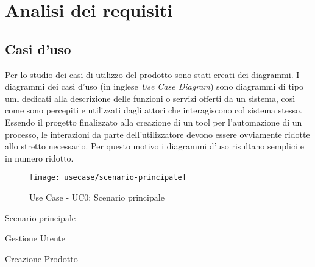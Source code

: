 \chapter{Analisi dei requisiti}
\label{cap:analisi-requisiti}

\section{Casi d'uso}

Per lo studio dei casi di utilizzo del prodotto sono stati creati dei diagrammi.
I diagrammi dei casi d'uso (in inglese \emph{Use Case Diagram}) sono diagrammi di tipo \gls{uml} dedicati alla descrizione delle funzioni o servizi offerti da un sistema, così come sono percepiti e utilizzati dagli attori che interagiscono col sistema stesso.
Essendo il progetto finalizzato alla creazione di un tool per l'automazione di un processo, le interazioni da parte dell'utilizzatore devono essere ovviamente ridotte allo stretto necessario. Per questo motivo i diagrammi d'uso risultano semplici e in numero ridotto.

\begin{figure}[ht] 
    \centering 
    \texttt{[image: usecase/scenario-principale]} 
    \caption{Use Case - UC0: Scenario principale}
\end{figure}

\begin{usecase}{0}{Scenario principale}
\label{uc:scenario-principale}
\end{usecase}

\begin{usecase}{1}{Gestione Utente}
\end{usecase}

\begin{usecase}{2}{Creazione Prodotto}
\end{usecase}

